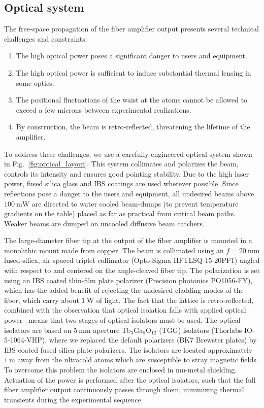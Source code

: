 \documentclass[twocolumn,aps,pra,showpacs,preprintnumbers,bibnotes]{revtex4-1}
\newcommand\unit[2]{\ensuremath{#1~\mathrm{{#2}}}}
\begin{document}
\subsection{Optical system}
The free-space propagation of the fiber amplifier output presents several technical challenges and constraints:
\begin{enumerate}
  \item The high optical power poses a significant danger to users and equipment.
  \item The high optical power is sufficient to induce substantial thermal lensing in some optics.
  \item The positional fluctuations of the waist at the atoms cannot be allowed to exceed a few microns between experimental realizations.
  \item By construction, the beam is retro-reflected, threatening the lifetime of the amplifier.
  \end{enumerate}

To address these challenges, we use a carefully engineered optical system shown in Fig.~\ref{fig:optical_layout}.
This system collimates and polarizes the beam, controls its intensity and ensures good pointing stability.
Due to the high laser power, fused silica glass and IBS coatings are used wherever possible.
Since reflections pose a danger to the users and equipment, all undesired beams above \unit{100}{mW} are directed to water cooled beam-dumps (to prevent temperature gradients on the table) placed as far as practical from critical beam paths.
Weaker beams are dumped on uncooled diffusive beam catchers.

The large-diameter fiber tip at the output of the fiber amplifier is mounted in a monolithic mount made from copper.
The beam is collimated using an $f=\unit{20}{mm}$ fused-silica, air-spaced triplet collimator (Opto-Sigma HFTLSQ-15-20PF1) angled with respect to and centered on the angle-cleaved fiber tip.
The polarization is set using an IBS coated thin-film plate polarizer (Precision photonics PO1056-FY), which has the added benefit of rejecting the undesired cladding modes of the fiber, which carry about \unit{1}{W} of light.
The fact that the lattice is retro-reflected, combined with the observation that optical isolation falls with applied optical power~\cite{Yoshida1999} means that two stages of optical isolators must be used.
The optical isolators are based on \unit{5}{mm} aperture Tb$_3$Ga$_5$O$_12$ (TGG) isolators (Thorlabs IO-5-1064-VHP), where we replaced the default polarizers (BK7 Brewster plates) by IBS-coated fused silica plate polarizers.
The isolators are located approximately \unit{1}{m} away from the ultracold atoms which are susceptible to stray magnetic fields.
To overcome this problem the isolators are enclosed in mu-metal shielding.
Actuation of the power is performed after the optical isolators, such that the full fiber amplifier output continuously passes through them, minimizing thermal transients during the experimental sequence.
\end{document}
